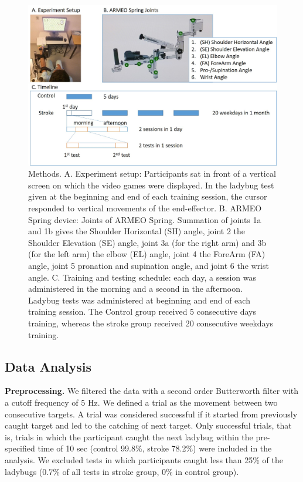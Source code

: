 \begin{figure}
	\centering
	\includegraphics[width=1\linewidth]{figures/1setup&schedule}
	\caption[Methods.]
	{Methods.
		A. Experiment setup: Participants sat in front of a vertical screen on which the video games were displayed. In the ladybug test given at the beginning and end of each training session, the cursor responded to vertical movements of the end-effector. 
		B. ARMEO Spring device: Joints of ARMEO Spring. Summation of joints 1a and 1b gives the Shoulder Horizontal (SH) angle, joint 2 the Shoulder Elevation (SE) angle, joint 3a (for the right arm) and 3b (for the left arm) the elbow (EL) angle, joint 4 the ForeArm (FA) angle, joint 5 pronation and supination angle, and joint 6 the wrist angle. 
		C. Training and testing schedule: each day, a session was administered in the morning and a second in the afternoon. Ladybug tests was administered at beginning and end of each training session. The Control group received 5 consecutive days training, whereas the stroke group received 20 consecutive weekdays training.}
	\label{fig:1setupschedule}
\end{figure}

\subsection{Data Analysis}

\textbf{Preprocessing.}
We filtered the data with a second order Butterworth filter \cite{Butterworth1930} with a cutoff frequency of 5 Hz. 
We defined a trial as the movement between two consecutive targets. 
A trial was considered successful if it started from previously caught target and led to the catching of next target. 
Only successful trials, that is, trials in which the participant caught the next ladybug within the pre-specified time of 10 sec (control 99.8\%, stroke 78.2\%) were included in the analysis. 
We excluded tests in which participants caught less than 25\% of the ladybugs (0.7\% of all tests in stroke group, 0\% in control group).


